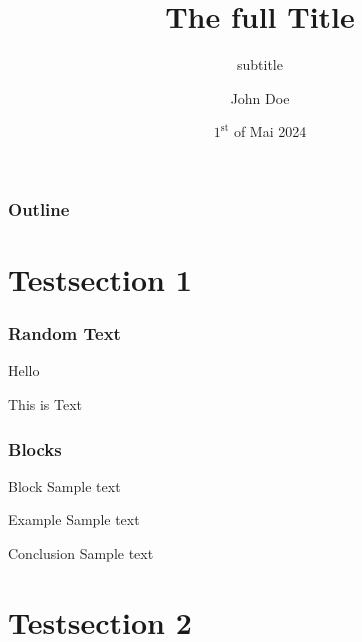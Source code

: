 \documentclass[aspectratio=169]{beamer}
\title[small title]{The full Title}
\subtitle{subtitle}
\author{John Doe}
\institute[TP III]{Chair for theoretical Physics III}
\date[01.05.2024]{$1^{\text{st}}$ of Mai 2024}
\begin{document}
\begin{frame}[t,plain]
    \maketitle
\end{frame}

\begin{frame}
    \frametitle{Outline}

    \tableofcontents

\end{frame}

\section{Testsection 1}

\begin{frame}
    \frametitle{Random Text}

    Hello\pause
    
    This is Text
\end{frame}

\begin{frame}
    \frametitle{Blocks}

    \begin{block}{Block}
        Sample text
    \end{block}

    \begin{exampleblock}{Example}
        Sample text
    \end{exampleblock}

    \begin{alertblock}{Conclusion}
        Sample text
    \end{alertblock}
\end{frame}

\section{Testsection 2}
\end{document}
